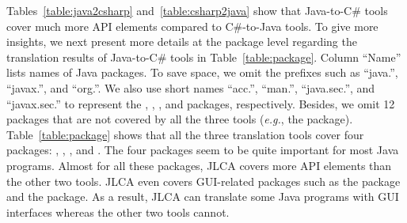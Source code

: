 Tables~\ref{table:java2csharp} and~\ref{table:csharp2java} show that Java-to-C\# tools cover much more API elements compared to C\#-to-Java tools. To give more insights, we next present more details at the package level regarding the translation results of Java-to-C\# tools in Table~\ref{table:package}. Column ``Name'' lists names of Java packages. To save space, we omit the prefixes such as ``java.'', ``javax.'', and ``org.''. We also use short names ``acc.'', ``man.'', ``java.sec.'', and ``javax.sec.'' to represent the , , , and  packages, respectively. Besides, we omit 12 packages that are not covered by all the three tools (\emph{e.g.}, the  package). Table~\ref{table:package} shows that all the three translation tools cover four packages: , , , and . The four packages seem to be quite important for most Java programs. Almost for all these packages, JLCA covers more API elements than the other two tools. JLCA even covers GUI-related packages such as the  package and the  package. As a result, JLCA can translate some Java programs with GUI interfaces whereas the other two tools cannot.
